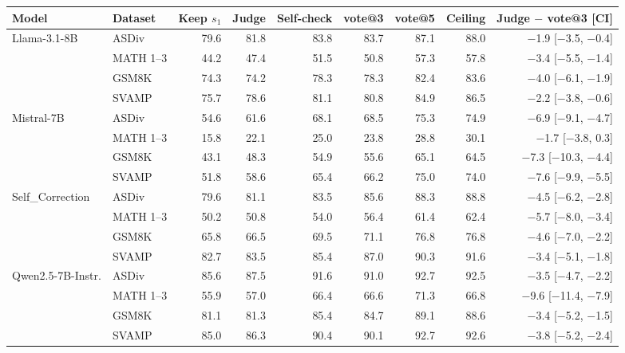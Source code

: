 \begin{tabular}{llrrrrrrr}
\toprule
Model & Dataset & Keep $s_1$ & Judge & Self-check & vote@3 & vote@5 & Ceiling & Judge $-$ vote@3 [CI] \\
\midrule
Llama-3.1-8B & ASDiv & 79.6 & 81.8 & 83.8 & 83.7 & 87.1 & 88.0 & $-$1.9 [$-$3.5, $-$0.4] \\
 & MATH 1--3 & 44.2 & 47.4 & 51.5 & 50.8 & 57.3 & 57.8 & $-$3.4 [$-$5.5, $-$1.4] \\
 & GSM8K & 74.3 & 74.2 & 78.3 & 78.3 & 82.4 & 83.6 & $-$4.0 [$-$6.1, $-$1.9] \\
 & SVAMP & 75.7 & 78.6 & 81.1 & 80.8 & 84.9 & 86.5 & $-$2.2 [$-$3.8, $-$0.6] \\
Mistral-7B & ASDiv & 54.6 & 61.6 & 68.1 & 68.5 & 75.3 & 74.9 & $-$6.9 [$-$9.1, $-$4.7] \\
 & MATH 1--3 & 15.8 & 22.1 & 25.0 & 23.8 & 28.8 & 30.1 & $-$1.7 [$-$3.8, 0.3] \\
 & GSM8K & 43.1 & 48.3 & 54.9 & 55.6 & 65.1 & 64.5 & $-$7.3 [$-$10.3, $-$4.4] \\
 & SVAMP & 51.8 & 58.6 & 65.4 & 66.2 & 75.0 & 74.0 & $-$7.6 [$-$9.9, $-$5.5] \\
Self\_Correction & ASDiv & 79.6 & 81.1 & 83.5 & 85.6 & 88.3 & 88.8 & $-$4.5 [$-$6.2, $-$2.8] \\
 & MATH 1--3 & 50.2 & 50.8 & 54.0 & 56.4 & 61.4 & 62.4 & $-$5.7 [$-$8.0, $-$3.4] \\
 & GSM8K & 65.8 & 66.5 & 69.5 & 71.1 & 76.8 & 76.8 & $-$4.6 [$-$7.0, $-$2.2] \\
 & SVAMP & 82.7 & 83.5 & 85.4 & 87.0 & 90.3 & 91.6 & $-$3.4 [$-$5.1, $-$1.8] \\
Qwen2.5-7B-Instr. & ASDiv & 85.6 & 87.5 & 91.6 & 91.0 & 92.7 & 92.5 & $-$3.5 [$-$4.7, $-$2.2] \\
 & MATH 1--3 & 55.9 & 57.0 & 66.4 & 66.6 & 71.3 & 66.8 & $-$9.6 [$-$11.4, $-$7.9] \\
 & GSM8K & 81.1 & 81.3 & 85.4 & 84.7 & 89.1 & 88.6 & $-$3.4 [$-$5.2, $-$1.5] \\
 & SVAMP & 85.0 & 86.3 & 90.4 & 90.1 & 92.7 & 92.6 & $-$3.8 [$-$5.2, $-$2.4] \\
\bottomrule
\end{tabular}

